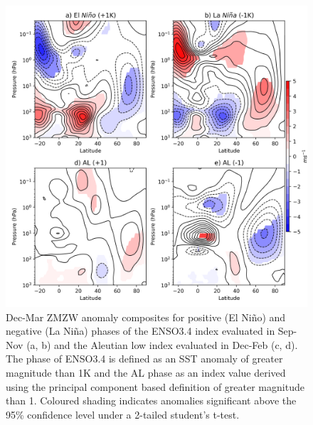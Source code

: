 \begin{figure}[h!]
\begin{center}
\noindent\includegraphics[width = 0.75\linewidth]{Figures/Figures-origins/ZMZW_comps_ENSO_AL.png}
\caption{Dec-Mar ZMZW anomaly composites for positive (El Ni\~{n}o) and negative (La Ni\~{n}a) phases of the ENSO3.4 index evaluated in Sep-Nov (a, b) and the Aleutian low index evaluated in Dec-Feb (c, d). The phase of ENSO3.4 is defined as an SST anomaly of greater magnitude than 1K and the AL phase as an index value derived using the principal component based definition of greater magnitude than 1. Coloured shading indicates anomalies significant above the 95\% confidence level under a 2-tailed student’s t-test.}
\label{fig:ZMZW_comp_ENSO_AL}
\end{center}
\end{figure}

